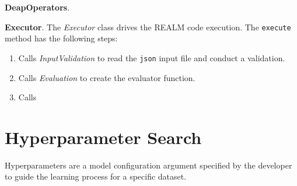 \vspace{0.2cm} 
\noindent
\textbf{DeapOperators}. 

\vspace{0.2cm} 
\noindent
\textbf{Executor}. The \textit{Executor} class drives the \gls{REALM} code
execution. 
The \texttt{execute} method has the following steps: 
\begin{enumerate}
    \item Calls \textit{InputValidation} to read the \texttt{json} input file 
    and conduct a validation.
    \item Calls \textit{Evaluation} to create the evaluator function. 
    \item Calls \textit{}
\end{enumerate}

\section{Hyperparameter Search}
Hyperparameters are a model configuration argument specified by the developer to 
guide the learning process for a specific dataset. 